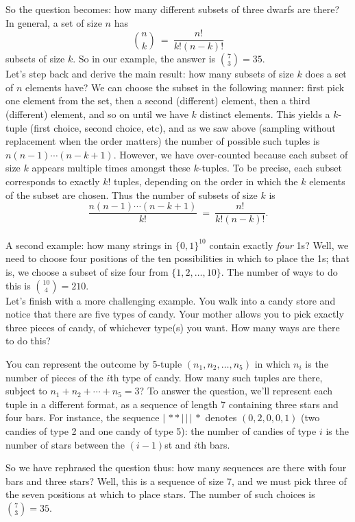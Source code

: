 So the question becomes: how many different subsets of three dwarfs are there?
In general, a set of size $n$ has 
$${n \choose k} \ = \ \frac{n!}{k! (n-k)!} $$ 
subsets of size $k$. So in our example, the answer is ${7 \choose 3} = 35$.
\\

Let's step back and derive the main result: how many subsets of size $k$ does a
set of $n$ elements have? We can choose the subset in the following manner: first
pick one element from the set, then a second (different) element, then a third 
(different) element, and so on until we have $k$ distinct elements. This yields 
a $k$-tuple (first choice, second choice, etc), and as we saw above (sampling
without replacement when the order matters) the number of possible such tuples 
is $n(n-1) \cdots (n-k+1)$. However, we have over-counted because each subset of 
size $k$ appears multiple times amongst these $k$-tuples. To be precise, each 
subset corresponds to exactly $k!$ tuples, depending on the order in which the 
$k$ elements of the subset are chosen. Thus the number of subsets of size $k$ is
$$ \frac{n(n-1)\cdots (n-k+1)}{k!} \ = \ \frac{n!}{k!(n-k)!} .$$
\\

A second example: how many strings in $\{0,1\}^{10}$ contain exactly
{\it four} 1s?  Well, we need to choose four positions of the ten
possibilities in which to place the 1s; that is, we choose a subset of
size four from $\{1,2,\ldots,10\}$.  The number of ways to do this is
${10 \choose 4} = 210$.
\\

Let's finish with a more challenging example. You walk into a candy
store and notice that there are five types of candy. Your mother
allows you to pick exactly three pieces of candy, of whichever type(s)
you want. How many ways are there to do this?

You can represent the outcome by 5-tuple $(n_1, n_2, \ldots, n_5)$ in
which $n_i$ is the number of pieces of the $i$th type of candy. How
many such tuples are there, subject to $n_1 + n_2 + \cdots + n_5 = 3$?
To answer the question, we'll represent each tuple in a different
format, as a sequence of length 7 containing three stars and four
bars. For instance, the sequence $|\,**\,|\,|\,|\,*$ denotes
$(0,2,0,0,1)$ (two candies of type 2 and one candy of type 5): the
number of candies of type $i$ is the number of stars between the
$(i-1)$st and $i$th bars.
 
So we have rephrased the question thus: how many sequences are there
with four bars and three stars? Well, this is a sequence of size 7,
and we must pick three of the seven positions at which to place
stars. The number of such choices is ${7 \choose 3} = 35$.

